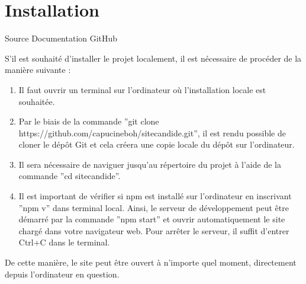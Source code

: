 \documentclass[a4,10pt,french]{sphinxmanual}
\begin{document}
\section{Installation}
\label{\detokenize{chapitre-02:installation}}
\sphinxAtStartPar
Source Documentation GitHub

\sphinxAtStartPar
S’il est souhaité d’installer le projet localement, il est nécessaire de procéder de la manière suivante :
\begin{enumerate}
%
\item {} 
\sphinxAtStartPar
Il faut ouvrir un terminal sur l’ordinateur où l’installation locale est souhaitée.

\item {} 
\sphinxAtStartPar
Par le biais de la commande ”git clone https://github.com/capucineboh/site\sphinxhyphen{}candide.git”, il est rendu possible de cloner le dépôt Git et cela créera une copie locale du dépôt sur l’ordinateur.

\item {} 
\sphinxAtStartPar
Il sera nécessaire de naviguer jusqu’au répertoire du projet à l’aide de la commande ”cd site\sphinxhyphen{}candide”.

\item {} 
\sphinxAtStartPar
Il est important de vérifier si npm est installé sur l’ordinateur en inscrivant ”npm \sphinxhyphen{}v” dans terminal local. Ainsi, le serveur de développement peut être démarré par la commande ”npm start” et ouvrir automatiquement le site chargé dans votre navigateur web. Pour arrêter le serveur, il suffit d’entrer Ctrl+C dans le terminal.

\end{enumerate}

\sphinxAtStartPar
De cette manière, le site peut être ouvert à n’importe quel moment, directement depuis l’ordinateur en question.
\end{document}

